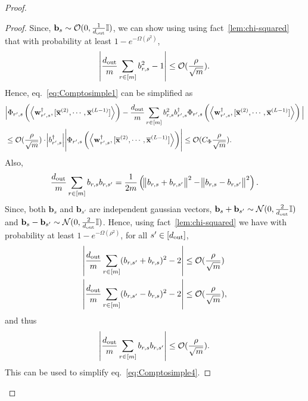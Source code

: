\begin{claim}
\begin{proof}
\begin{proof}
				Since, $\mathbf{b}_{s} \sim \mathcal{O}(0, \frac{1}{d_{\mathrm{out}} }\mathbb{I})$, we can show using using fact~\ref{lem:chi-squared} that with probability at least $1 - e^{-\Omega(\rho^2)}$,
				\begin{align*}
					\abs{\frac{d_{\mathrm{out}} }{m} \sum_{r \in [m]} b_{r, s}^2 - 1} \le \mathcal{O}(\frac{\rho}{\sqrt{m}}).
				\end{align*}   
				Hence, eq.~\ref{eq:Comptosimple1} can be simplified as 
				\begin{align*}
					&\Big| \Phi_{r', s} \left(\left\langle \mathbf{w}_{r', s}^{\dagger}, [\overline{\mathbf{x}}^{(2)}, \cdots, \overline{\mathbf{x}}^{(L-1)}]\right\rangle\right)  - \frac{d_{\mathrm{out}} }{m} \sum_{r \in [m]}  b^2_{r, s} b_{r', s}^{\dagger} \Phi_{r', s} \left(\left\langle \mathbf{w}_{r', s}^{\dagger}, [\overline{\mathbf{x}}^{(2)}, \cdots, \overline{\mathbf{x}}^{(L-1)}]\right\rangle\right) \Big| \\&
					\le \mathcal{O}(\frac{\rho}{\sqrt{m}}) \cdot \abs{b_{r', s}^{\dagger}} \abs{\Phi_{r', s} \left(\left\langle \mathbf{w}_{r', s}^{\dagger}, [\overline{\mathbf{x}}^{(2)}, \cdots, \overline{\mathbf{x}}^{(L-1)}]\right\rangle\right)} 
					\le \mathcal{O}(C_{\Phi}\frac{\rho}{\sqrt{m}}). 
				\end{align*}
				Also, 
				\begin{align*}
					\frac{d_{\mathrm{out}} }{m} \sum_{r \in [m]}  b_{r, s} b_{r, s'} = \frac{1}{2m} \left(\norm{b_{r, s} + b_{r, s'}}^2 - \norm{b_{r, s} - b_{r, s'}}^2\right).    
				\end{align*}
				Since, both $\mathbf{b}_s$ and $\mathbf{b}_{s'}$ are independent gaussian vectors, $\mathbf{b}_{s} + \mathbf{b}_{s'} \sim \mathcal{N}(0, \frac{2}{d_{\mathrm{out}} }\mathbb{I})$ and $\mathbf{b}_{s} - \mathbf{b}_{s'} \sim \mathcal{N}(0, \frac{2}{d_{\mathrm{out}} }\mathbb{I})$. Hence, using fact~\ref{lem:chi-squared} we have with probability at least $1 - e^{-\Omega(\rho^2)}$, for all $s' \in [d_{\mathrm{out}} ]$,
				\begin{align*}
					&\abs{\frac{d_{\mathrm{out}} }{m} \sum_{r \in [m]} (b_{r, s'} + b_{r, s})^2 - 2} \le \mathcal{O}(\frac{\rho}{\sqrt{m}}) \\&
					\abs{\frac{d_{\mathrm{out}} }{m} \sum_{r \in [m]} (b_{r, s'} - b_{r, s})^2 - 2} \le \mathcal{O}(\frac{\rho}{\sqrt{m}}),
				\end{align*}
				and thus
				\begin{align*}
					\abs{\frac{d_{\mathrm{out}} }{m} \sum_{r \in [m]}  b_{r, s} b_{r, s'}} \le \mathcal{O}(\frac{\rho}{\sqrt{m}}).
				\end{align*}
				This can be used to simplify eq.~\ref{eq:Comptosimple4}.

\end{proof}
\end{proof}
\end{claim}
